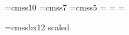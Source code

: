 
\newif\if@emph \@emphfalse
\def\em{\toggle@emph\if@emph\it\else\rm\fi} 
\def\toggle@emph{\if@emph\@emphfalse\else\@emphtrue\fi}
\def\emph#1{{\em #1\/}}

\def\textsc#1{{\tensc #1}}
\def\textit#1{{\it #1\/}}
\def\textsl#1{{\sl #1\/}}
\def\textbf#1{{\bf #1}}
\def\texttt#1{{\tt #1}}
\def\textrm#1{{\rm #1}}
\def\mathcal#1{{\cal #1}}

\font\sften=cmss10
\font\sfseven=cmss7
\font\sffive=cmss5
\newfam\sffam
\textfont\sffam=\sften
\scriptfont\sffam=\sfseven
\scriptscriptfont\sffam=\sffive
\def\sf{\fam\sffam\sften}
\def\textsf#1{{\sf#1}}

\def\text#1{{\rm #1}}

\def\oldstylenums#1{\ifmmode{\oldstyle #1}\else${\oldstyle #1}$\fi}


\def\title#1{\gdef\@title{#1}}
\def\author#1{\gdef\@author{#1}}
\long{}
\font\titlefont=cmssbx12 scaled %

\def\@maketitleaddenda{}
\def\@maketitle{\vskip2em%
  \centerline{\titlefont \@title}%
  \vskip1.5em\centerline{\twelverm\@author}%
  \ifx\@date\relax\else\vskip 1em\centerline{\twelverm \@date }\par\fi%
  \vskip 1.5em%
}
\def\maketitle{\@maketitle
  \mbox{ }\par
  \gdef\@maketitle{}
  \mbox{ }\vfill
  \@maketitleaddenda
  \eject}

\def\mbox#1{\leavevmode\hbox{#1}}

\def\strut@{\copy\strutbox@}
\newbox\strutbox@

\newif\ifinany@
\def\Let@{\relax \let\\=\cr }
\def\aligned{\null\,\vcenter\aligned@}
\def\vspace@{\def\vspace##1{\crcr\noalign{\vskip##1\relax}}}
\def\aligned@{\bgroup\vspace@\Let@
 \ifinany@\else\openup\jot\fi\ialign
 \bgroup\hfil\strut@$\m@th\displaystyle{##}$&
 $\m@th\displaystyle{{}##}$\hfil\crcr}
\def\endaligned{\crcr\egroup\egroup}


\def\center{\centering}
\def\endcenter{}

